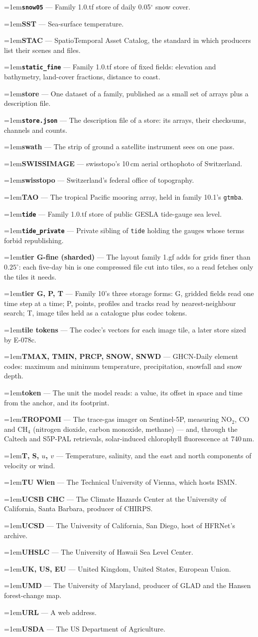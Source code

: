 \documentclass[10pt]{article}
\newcommand{\code}[1]{\texttt{#1}}
\newcommand{\gl}[2]{\par\hangindent=1em\hangafter=1\textbf{#1} --- #2\par}
\begin{document}
\gl{\code{snow05}}{Family 1.0.tf store of daily 0.05$^\circ$ snow cover.}
\gl{SST}{Sea-surface temperature.}
\gl{STAC}{SpatioTemporal Asset Catalog, the standard in which producers list their scenes and files.}
\gl{\code{static\_fine}}{Family 1.0.tf store of fixed fields: elevation and bathymetry, land-cover fractions, distance to coast.}
\gl{store}{One dataset of a family, published as a small set of arrays plus a description file.}
\gl{\code{store.json}}{The description file of a store: its arrays, their checksums, channels and counts.}
\gl{swath}{The strip of ground a satellite instrument sees on one pass.}
\gl{SWISSIMAGE}{swisstopo's 10\,cm aerial orthophoto of Switzerland.}
\gl{swisstopo}{Switzerland's federal office of topography.}
\gl{TAO}{The tropical Pacific mooring array, held in family 10.1's \code{gtmba}.}
\gl{\code{tide}}{Family 1.0.tf store of public GESLA tide-gauge sea level.}
\gl{\code{tide\_private}}{Private sibling of \code{tide} holding the gauges whose terms forbid republishing.}
\gl{tier G-fine (sharded)}{The layout family 1.gf adds for grids finer than $0.25^\circ$: each five-day bin is one compressed file cut into tiles, so a read fetches only the tiles it needs.}
\gl{tier G, P, T}{Family 10's three storage forms: G, gridded fields read one time step at a time; P, points, profiles and tracks read by nearest-neighbour search; T, image tiles held as a catalogue plus codec tokens.}
\gl{tile tokens}{The codec's vectors for each image tile, a later store sized by E-078c.}
\gl{TMAX, TMIN, PRCP, SNOW, SNWD}{GHCN-Daily element codes: maximum and minimum temperature, precipitation, snowfall and snow depth.}
\gl{token}{The unit the model reads: a value, its offset in space and time from the anchor, and its footprint.}
\gl{TROPOMI}{The trace-gas imager on Sentinel-5P, measuring NO$_2$, CO and CH$_4$ (nitrogen dioxide, carbon monoxide, methane) --- and, through the Caltech and S5P-PAL retrievals, solar-induced chlorophyll fluorescence at 740\,nm.}
\gl{T, S, $u$, $v$}{Temperature, salinity, and the east and north components of velocity or wind.}
\gl{TU Wien}{The Technical University of Vienna, which hosts ISMN.}
\gl{UCSB CHC}{The Climate Hazards Center at the University of California, Santa Barbara, producer of CHIRPS.}
\gl{UCSD}{The University of California, San Diego, host of HFRNet's archive.}
\gl{UHSLC}{The University of Hawaii Sea Level Center.}
\gl{UK, US, EU}{United Kingdom, United States, European Union.}
\gl{UMD}{The University of Maryland, producer of GLAD and the Hansen forest-change map.}
\gl{URL}{A web address.}
\gl{USDA}{The US Department of Agriculture.}
\end{document}
